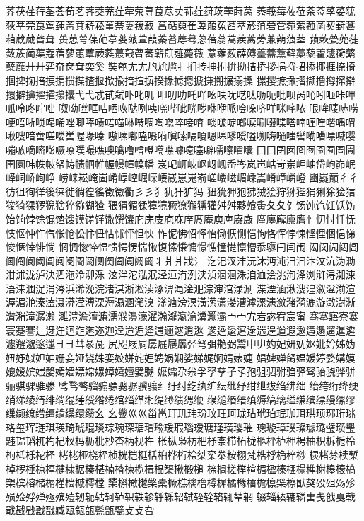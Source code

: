 荞茯荏荇荃荟荀茗荠茭茺茳荦荥荨茛荩荬荪荭荮莰荸莳莴
莠莪莓莜莅荼莶莩荽莸荻莘莞莨莺莼菁萁菥菘堇萘萋菝菽
菖萜萸萑萆菔菟萏萃菸菹菪菅菀萦菰菡葜葑葚葙葳蒇蒈葺
蒉葸萼葆葩葶蒌蒎萱葭蓁蓍蓐蓦蒽蓓蓊蒿蒺蓠蒡蒹蒴蒗蓥
蓣蔌甍蔸蓰蔹蔟蔺蕖蔻蓿蓼蕙蕈蕨蕤蕞蕺瞢蕃蕲蕻薤薨薇
薏蕹薮薜薅薹薷薰藓藁藜藿蘧蘅蘩蘖蘼⼶廾弈夼奁耷奕奚
奘匏⼪尢尥尬尴扌扪抟抻拊拚拗拮挢拶挹捋捃掭揶捱捺掎
掴捭掬掊捩掮掼揲揸揠揿揄揞揎摒揆掾摅摁搋搛搠搌搦搡
摞撄摭撖摺撷撸撙撺擀擐擗擤擢攉攥攮⼷弋忒甙弑卟叱叽
叩叨叻吒吖吆呋呒呓呔呖呃吡呗呙吣吲咂咔呷呱呤咚咛咄
呶呦咝哐咭哂咴哒咧咦哓哔呲咣哕咻咿哌哙哚哜咩咪咤哝
哏哞唛哧唠哽唔哳唢唣唏唑唧唪啧喏喵啉啭啁啕唿啐唼唷
啖啵啶啷唳唰啜喋嗒喃喱喹喈喁喟啾嗖喑啻嗟喽喾喔喙嗪
嗷嗉嘟嗑嗫嗬嗔嗦嗝嗄嗯嗥嗲嗳嗌嗍嗨嗵嗤辔嘞嘈嘌嘁嘤
嘣嗾嘀嘧嘭噘嘹噗嘬噍噢噙噜噌噔嚆噤噱噫噻噼嚅嚓嚯囔
⼞囗囝囡囵囫囹囿圄圊圉圜帏帙帔帑帱帻帼帷幄幔幛幞幡
岌屺岍岐岖岈岘岙岑岚岜岵岢岽岬岫岱岣峁岷峄峒峤峋峥
崂崃崧崦崮崤崞崆崛嵘崾崴崽嵬嵛嵯嵝嵫嵋嵊嵩嵴嶂嶙嶝
豳嶷巅⼻彳彷徂徇徉後徕徙徜徨徭徵徼衢⼺彡犭犰犴犷犸
狃狁狎狍狒狨狯狩狲狴狷猁狳猃狺狻猗猓猡猊猞猝猕猢猹
猥猬猸猱獐獍獗獠獬獯獾⾇舛夥飧夤⼡夂饣饧饨饩饪饫饬
饴饷饽馀馄馇馊馍馐馑馓馔馕庀庑庋庖庥庠庹庵庾庳赓廒
廑廛廨廪膺忄忉忖忏怃忮怄忡忤忾怅怆忪忭忸怙怵怦怛怏
怍怩怫怊怿怡恸恹恻恺恂恪恽悖悚悭悝悃悒悌悛惬悻悱惝
惘惆惚悴愠愦愕愣惴愀愎愫慊慵憬憔憧憷懔懵忝隳闩闫闱
闳闵闶闼闾阃阄阆阈阊阋阌阍阏阒阕阖阗阙阚丬⽙爿戕氵
汔汜汊沣沅沐沔沌汨汩汴汶沆沩泐泔沭泷泸泱泗沲泠泖泺
泫泮沱泓泯泾洹洧洌浃浈洇洄洙洎洫浍洮洵洚浏浒浔洳涑
浯涞涠浞涓涔浜浠浼浣渚淇淅淞渎涿淠渑淦淝淙渖涫渌涮
渫湮湎湫溲湟溆湓湔渲渥湄滟溱溘滠漭滢溥溧溽溻溷滗溴
滏溏滂溟潢潆潇漤漕滹漯漶潋潴漪漉漩澉澍澌潸潲潼潺濑
濉澧澹澶濂濡濮濞濠濯瀚瀣瀛瀹瀵灏灞⼧宀宄宕宓宥宸甯
骞搴寤寮褰寰蹇謇辶迓迕迥迮迤迩迦迳迨逅逄逋逦逑逍逖
逡逵逶逭逯遄遑遒遐遨遘遢遛暹遴遽邂邈邃邋⼹彐彗彖彘
尻咫屐屙孱屣屦羼弪弩弭艴弼鬻⼬屮妁妃妍妩妪妣妗姊妫
妞妤姒妲妯姗妾娅娆姝娈姣姘姹娌娉娲娴娑娣娓婀婧婊婕
娼婢婵胬媪媛婷婺媾嫫媲嫒嫔媸嫠嫣嫱嫖嫦嫘嫜嬉嬗嬖嬲
嬷孀尕尜孚孥孳孑孓孢驵驷驸驺驿驽骀骁骅骈骊骐骒骓骖
骘骛骜骝骟骠骢骣骥骧纟纡纣纥纨纩纭纰纾绀绁绂绉绋绌
绐绔绗绛绠绡绨绫绮绯绱绲缍绶绺绻绾缁缂缃缇缈缋缌缏
缑缒缗缙缜缛缟缡缢缣缤缥缦缧缪缫缬缭缯缰缱缲缳缵⼳
幺畿⼮巛甾邕玎玑玮玢玟珏珂珑玷玳珀珉珈珥珙顼琊珩珧
珞玺珲琏琪瑛琦琥琨琰琮琬琛琚瑁瑜瑗瑕瑙瑷瑭瑾璜璎璀
璁璇璋璞璨璩璐璧瓒璺韪韫韬杌杓杞杈杩枥枇杪杳枘枧杵
枨枞枭枋杷杼柰栉柘栊柩枰栌柙枵柚枳柝栀柃枸柢栎柁柽
栲栳桠桡桎桢桄桤梃栝桕桦桁桧桀栾桊桉栩梵梏桴桷梓桫
棂楮棼椟椠棹椤棰椋椁楗棣椐楱椹楠楂楝榄楫榀榘楸椴槌
榇榈槎榉楦楣楹榛榧榻榫榭槔榱槁槊槟榕槠榍槿樯槭樗樘
橥槲橄樾檠橐橛樵檎橹樽樨橘橼檑檐檩檗檫猷獒殁殂殇殄
殒殓殍殚殛殡殪轫轭轱轲轳轵轶轸轷轹轺轼轾辁辂辄辇辋
辍辎辏辘辚軎戋戗戛戟戢戡戥戤戬臧瓯瓴瓿甏甑甓⽁攴旮
